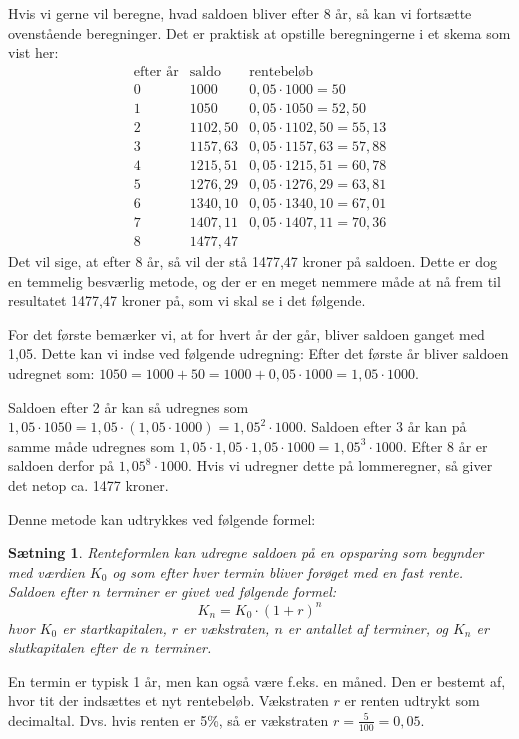 \documentclass[12pt,oneside,a4paper]{article}
\newtheorem{thm}{Sætning}[section]
\begin{document}
Hvis vi gerne vil beregne, hvad saldoen bliver efter 8 år, så kan vi fortsætte
ovenstående beregninger. Det er praktisk at opstille beregningerne i et skema
som vist her:
$$
\begin{array}{r|c|l}
    \mbox{efter år} & \mbox{saldo} & \mbox{rentebeløb} \\
    \hline
0 & 1000 & 0,05\cdot 1000 = 50 \\
    \hline
1 & 1050 & 0,05\cdot 1050 = 52,50 \\
    \hline
2 & 1102,50 & 0,05\cdot 1102,50 = 55,13 \\
    \hline
3 & 1157,63 & 0,05\cdot 1157,63 = 57,88 \\
    \hline
4 & 1215,51 & 0,05\cdot 1215,51 = 60,78 \\
    \hline
5 & 1276,29 & 0,05\cdot 1276,29 = 63,81 \\
    \hline
6 & 1340,10 & 0,05\cdot 1340,10 = 67,01 \\
    \hline
7 & 1407,11 & 0,05\cdot 1407,11 = 70,36 \\
    \hline
8 & 1477,47 & 
\end{array}
$$
Det vil sige, at efter 8 år, så vil der stå 1477,47 kroner på saldoen.  Dette
er dog en temmelig besværlig metode, og der er en meget nemmere måde at nå frem
til resultatet 1477,47 kroner på, som vi skal se i det følgende.

For det første bemærker vi, at for hvert år der går, bliver saldoen ganget med
1,05. Dette kan vi indse ved følgende udregning: Efter det første år bliver
saldoen udregnet som: $1050 = 1000 + 50 = 1000 + 0,05\cdot 1000 = 1,05 \cdot
1000$.

Saldoen efter 2 år kan så udregnes som $1,05\cdot 1050 = 1,05 \cdot (1,05 \cdot
1000) = 1,05^2 \cdot 1000$. Saldoen efter 3 år kan på samme måde udregnes som
$1,05\cdot1,05\cdot1,05\cdot 1000 = 1,05^3 \cdot 1000$. Efter 8 år er saldoen
derfor på $1,05^8\cdot 1000$. Hvis vi udregner dette på lommeregner, så giver
det netop ca. 1477 kroner.

Denne metode kan udtrykkes ved følgende formel:
\begin{thm}
    {\em Renteformlen} kan udregne saldoen på en opsparing som begynder med
    værdien $K_0$ og som efter hver {\em termin} bliver forøget med en fast
    rente. Saldoen efter $n$ terminer er givet ved følgende formel:
    $$
    K_n = K_0 \cdot (1+r)^n
    $$
    hvor $K_0$ er {\em startkapitalen}, $r$ er {\em vækstraten}, $n$ er antallet af
    terminer, og $K_n$ er {\em slutkapitalen} efter de $n$ terminer.
\end{thm}
En termin er typisk 1 år, men kan også være f.eks. en måned. Den er bestemt af,
hvor tit der indsættes et nyt rentebeløb. Vækstraten $r$ er renten udtrykt som
decimaltal. Dvs. hvis renten er 5\%, så er vækstraten $r=\frac{5}{100}=0,05$.
\end{document}
